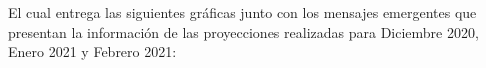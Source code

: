 \documentclass[conference,compsoc,onecolumn]{IEEEtran}
\begin{document}
El cual entrega las siguientes gráficas junto con los mensajes emergentes que presentan la información de las proyecciones realizadas para Diciembre 2020, Enero 2021 y Febrero 2021:
\\\

\begin{figure}[htbp]
\centering
{}
\label{fig:lego}
\end{figure}

\begin{figure}[htbp]
\centering
{}
\label{fig:lego}
\end{figure}
\\\
\end{document}
